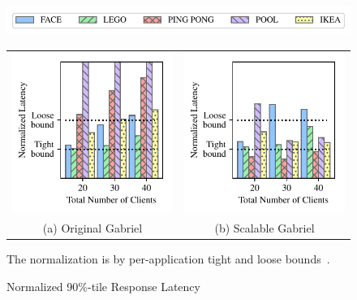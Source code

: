 \begin{figure}[]
  \begin{center}
    \includegraphics[width=\linewidth]{FIGS/fig-alloc-latency-legend.pdf}

    \begin{tabular}{c@{}c}
      \includegraphics[width=.5\linewidth]{FIGS/fig-eval-latency-baseline.pdf}
                              & \includegraphics[width=.5\linewidth]{FIGS/fig-eval-latency-cpushares.pdf} \\
      {(a) Original  Gabriel} & {(b) Scalable Gabriel}
    \end{tabular}
  \end{center}

  \begin{captiontext}
    \centering
    The normalization is by per-application tight and loose
    bounds~\cite{chen2017empirical}.
  \end{captiontext}
  \vspace{-0.1in}
  \caption{Normalized 90\%-tile Response Latency}
  \label{fig:frame-latency}
\end{figure}

